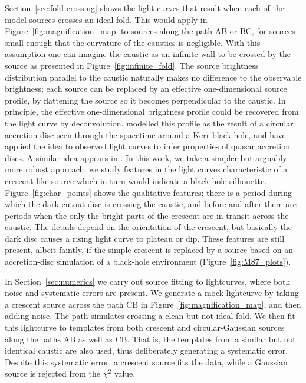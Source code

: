 \documentclass[usenatbib]{mn2e}
\begin{document}
Section~\ref{sec:fold-crossing} shows the light curves that result
when each of the model sources crosses an ideal fold.  This would
apply in Figure~\ref{fig:magnification_map} to sources along the path
AB or BC, for sources small enough that the curvature of the caustics
is negligible.  With this assumption one can imagine the caustic as an
infinite wall to be crossed by the source as presented in
Figure~\ref{fig:infinite_fold}.  The source brightness distribution
parallel to the caustic naturally makes no difference to the
observable brightness; each source can be replaced by an effective
one-dimensional source profile, by flattening the source so it becomes
perpendicular to the caustic.  In principle, the effective
one-dimensional brightness profile could be recovered from the light
curve by deconvolution.  \cite{1999ApJ...524...49A} modelled this
profile as the result of a circular accretion disc seen through the
spacetime around a Kerr black hole, and \cite{2012MNRAS.423..676A}
have applied the idea to observed light curves to infer properties of
quasar accretion discs.  A similar idea appears in
\cite{2013ApJ...769..131C}.  In this work, we take a simpler but
arguably more robust approach: we study features in the light curves
characteristic of a crescent-like source which in turn would indicate
a black-hole silhouette.  Figure~\ref{fig:char_points} shows the
qualitative features: there is a period during which the dark cutout
disc is crossing the caustic, and before and after there are periods
when the only the bright parts of the crescent are in transit across
the caustic.  The details depend on the orientation of the crescent,
but basically the dark disc causes a rising light curve to plateau or
dip.  These features are still present, albeit faintly, if the simple
crescent is replaced by a source based on an accretion-disc simulation
of a black-hole environment (Figure~\ref{fig:M87_plots}).

In Section~\ref{sec:numerics} we carry out source fitting to
lightcurves, where both noise and systematic errors are present.  We
generate a mock lightcurve by taking a crescent source across the path
CB in Figure~\ref{fig:magnification_map}, and then adding noise.  The
path simulates crossing a clean but not ideal fold.  We then fit this
lightcurve to templates from both crescent and circular-Gaussian
sources along the paths AB as well as CB.  That is, the templates from
a similar but not identical caustic are also used, thus deliberately
generating a systematic error.  Despite this systematic error, a
crescent source fits the data, while a Gaussian source is rejected
from the $\chi^2$ value.
\end{document}
